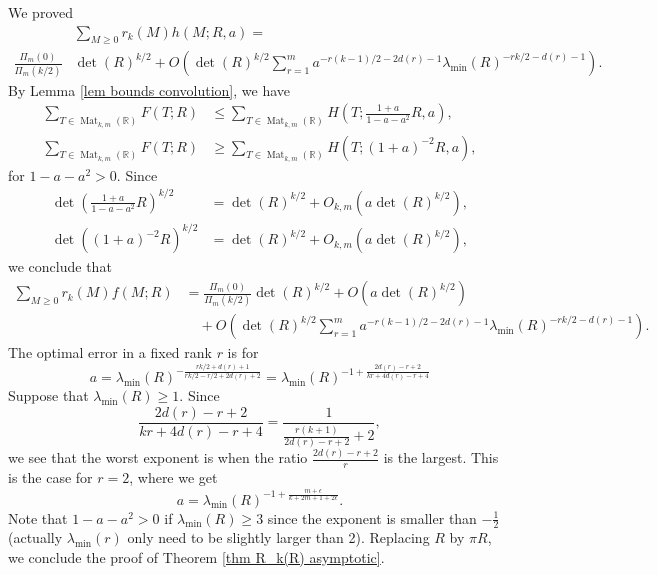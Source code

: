 \documentclass[oneside]{amsart}
\numberwithin{equation}{section}
\theoremstyle{definition}
\theoremstyle{remark}
\theoremstyle{remark}
\newcommand{\RR}{\mathbb R}
\DeclareMathOperator{\Mat}{Mat}
\begin{document}
We proved
\begin{align*}
	&\sum_{M\geq0}r_k(M)h(M;R,a)=\\
\frac{\Pi_m(0)}{\Pi_m(k/2)}&\det(R)^{k/2}+O\left(\det(R)^{k/2}\sum_{r=1}^ma^{-r(k-1)/2-2d(r)-1}\lambda_{\min}(R)^{-rk/2-d(r)-1}\right).
\end{align*}
By Lemma \ref{lem bounds convolution}, we have
\begin{align*}
\sum_{T\in\Mat_{k,m}(\RR)}F(T;R)&\leq\sum_{T\in\Mat_{k,m}(\RR)}H\left(T;\frac{1+a}{1-a-a^2}R,a\right),\\
\sum_{T\in\Mat_{k,m}(\RR)}F(T;R)&\geq\sum_{T\in\Mat_{k,m}(\RR)}H(T;(1+a)^{-2}R,a),
\end{align*}
for $1-a-a^2>0$. Since
\begin{align*}
\det\left(\frac{1+a}{1-a-a^2}R\right)^{k/2}&=\det(R)^{k/2}+O_{k,m}(a\det(R)^{k/2}),\\
\det((1+a)^{-2}R)^{k/2}&=\det(R)^{k/2}+O_{k,m}(a\det(R)^{k/2}),
\end{align*}
we conclude that
\begin{align*}
\sum_{M\geq0}r_k(M)f(M;R)&=\frac{\Pi_m(0)}{\Pi_m(k/2)}\det(R)^{k/2}+O(a\det(R)^{k/2})\\
	&\quad +O(\det(R)^{k/2}\sum_{r=1}^ma^{-r(k-1)/2-2d(r)-1}\lambda_{\min}(R)^{-rk/2-d(r)-1}).
\end{align*}
The optimal error in a fixed rank $r$ is for
$$a=\lambda_{\min}(R)^{-\frac{rk/2+d(r)+1}{rk/2-r/2+2d(r)+2}}=\lambda_{\min}(R)^{-1+\frac{2d(r)-r+2}{kr+4d(r)-r+4}}$$
Suppose that $\lambda_{\min}(R)\geq1$. Since
$$\frac{2d(r)-r+2}{kr+4d(r)-r+4}=\frac1{\frac{r(k+1)}{2d(r)-r+2}+2},$$
we see that the worst exponent is when the ratio $\frac{2d(r)-r+2}r$ is the largest. This is the case for $r=2$, where we get
$$a=\lambda_{\min}(R)^{-1+\frac{m+\epsilon}{k+2m+1+2\epsilon}}.$$
Note that $1-a-a^2>0$ if $\lambda_{\min}(R)\geq3$ since the exponent is smaller than $-\frac12$ (actually $\lambda_{\min}(r)$ only need to be slightly larger than 2). Replacing $R$ by $\pi R$, we conclude the proof of Theorem \ref{thm R_k(R) asymptotic}.

\printbibliography
\end{document}
